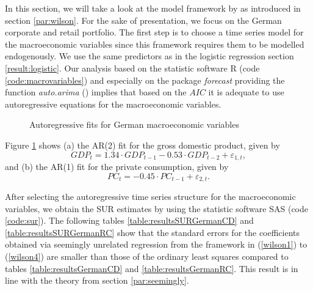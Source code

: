 \documentclass[a4paper, 12pt]{scrreprt}
\begin{document}
In this section, we will take a look at the model framework by \textcite{wilson1997wilsonI} as introduced in section \ref{par:wilson}. For the sake of presentation, we focus on the German corporate and retail portfolio. The first step is to choose a time series model for the macroeconomic variables since this framework requires them to be modelled endogenously.
We use the same predictors as in the logistic regression section \ref{result:logistic}.
Our analysis based on the statistic software R (code \ref{code:macrovariables}) and especially on the package \textit{forecast} providing the function \textit{auto.arima} (\textcite{hyndman2017forecast}) implies that based on the $AIC$ it is adequate to use autoregressive equations for the macroeconomic variables. 


\begin{figure}[H]
	\caption{Autoregressive fits for German macroeconomic variables}
	\label{plot:ARfit}
\end{figure}

Figure \ref{plot:ARfit} shows (a) the AR(2) fit for the gross domestic product, given by
\begin{equation*}
GDP_t = 1.34 \cdot GDP_{t-1} - 0.53 \cdot GDP_{t-2} + \varepsilon_{1,t},
\end{equation*}
and (b) the AR(1) fit for the private consumption, given by
\begin{equation*}
PC_t = -0.45 \cdot PC_{t-1} + \varepsilon_{2,t}.
\end{equation*}


After selecting the autoregressive time series structure for the macroeconomic variables, we obtain the SUR estimates by using the statistic software SAS (code \ref{code:sur}).
The following tables \ref{table:resultsSURGermanCD} and \ref{table:resultsSURGermanRC} show that the standard errors for the coefficients obtained via seemingly unrelated regression from the framework in (\ref{wilson1}) to (\ref{wilson4}) are smaller than those of the ordinary least squares compared to tables \ref{table:resultsGermanCD} and \ref{table:resultsGermanRC}.
This result is in line with the theory from section \ref{par:seemingly}.

\bigskip
\end{document}
